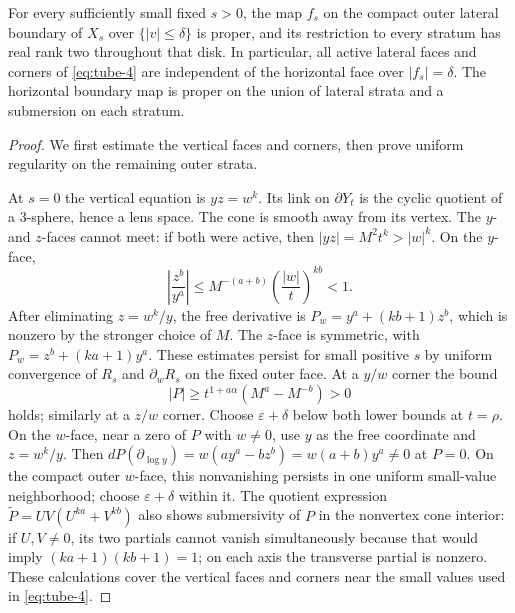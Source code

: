 \begin{lemma}\label{lem:boundary}
For every sufficiently small fixed \(s>0\), the map \(f_s\) on
the compact outer lateral boundary of \(X_s\) over
\(\{|v|\le\delta\}\) is proper, and its restriction to every
stratum has real rank two throughout that disk.
In particular, all active lateral faces and corners of \eqref{eq:tube-4}
are independent of the horizontal face over \(|f_s|=\delta\).
The horizontal boundary map is proper on the union of lateral
strata and a submersion on each stratum.
\end{lemma}
\begin{proof}
We first estimate the vertical faces and corners, then prove
uniform regularity on the remaining outer strata.

At \(s=0\) the vertical equation is \(yz=w^k\). Its link on
\(\partial Y_t\) is the cyclic quotient of a 3-sphere, hence a lens
space. The cone is smooth away from its vertex. The \(y\)- and
\(z\)-faces cannot meet: if both were active, then
\(|yz|=M^2t^k>|w|^k\). On the \(y\)-face,
\begin{equation}
\left|\frac{z^b}{y^a}\right|
\le M^{-(a+b)}\left(\frac{|w|}{t}\right)^{kb}<1.
\label{eq:tube-5}
\end{equation}
After eliminating \(z=w^k/y\), the free derivative is
\(P_w=y^a+(kb+1)z^b\), which is nonzero by the stronger choice
of \(M\). The \(z\)-face is symmetric, with
\(P_w=z^b+(ka+1)y^a\). These estimates persist for small
positive \(s\) by uniform convergence of \(R_s\) and
\(\partial_wR_s\) on the fixed outer face.
At a \(y/w\) corner the bound
\begin{equation}
 |P|\ge t^{1+a\alpha}(M^a-M^{-b})>0
\label{eq:tube-6}
\end{equation}
holds; similarly at a \(z/w\) corner. Choose
\(\varepsilon+\delta\) below both lower bounds at \(t=\rho\).
On the \(w\)-face, near a zero of \(P\) with \(w\ne0\),
use \(y\) as the free coordinate and \(z=w^k/y\).
Then \(dP(\partial_{\log y})=w(ay^a-bz^b)
=w(a+b)y^a\ne0\) at \(P=0\).
On the compact outer \(w\)-face, this nonvanishing persists in
one uniform small-value neighborhood; choose
\(\varepsilon+\delta\) within it.
The quotient expression \(\widetilde P=UV(U^{ka}+V^{kb})\)
also shows submersivity of \(P\) in the nonvertex cone interior:
if \(U,V\ne0\), its two partials cannot vanish simultaneously
because that would imply \((ka+1)(kb+1)=1\);
on each axis the transverse partial is nonzero.
These calculations cover the vertical faces and corners near the
small values used in \eqref{eq:tube-4}.


\end{proof}
